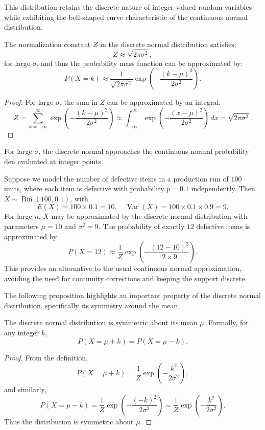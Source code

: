 This distribution retains the discrete nature of integer-valued random variables while exhibiting the bell-shaped curve characteristic of the continuous normal distribution.

\begin{proposition}
The normalization constant \( Z \) in the discrete normal distribution satisfies:
\[
Z \approx \sqrt{2\pi \sigma^2},
\]
for large \( \sigma \), and thus the probability mass function can be approximated by:
\[
P(X = k) \approx \frac{1}{\sqrt{2\pi \sigma^2}} \exp\left( -\frac{(k - \mu)^2}{2\sigma^2} \right).
\]
\end{proposition}
\begin{proof}
For large \( \sigma \), the sum in \( Z \) can be approximated by an integral:
\[
Z = \sum_{k = -\infty}^{\infty} \exp\left( -\frac{(k - \mu)^2}{2\sigma^2} \right) \approx \int_{-\infty}^{\infty} \exp\left( -\frac{(x - \mu)^2}{2\sigma^2} \right) \, dx = \sqrt{2\pi \sigma^2}.
\]
\end{proof}

For large \( \sigma \), the discrete normal approaches the continuous normal probability den evaluated at integer points.

\begin{example}
Suppose we model the number of defective items in a production run of $100$ units, where each item is defective with probability $p = 0.1$ independently. Then $X \sim \operatorname{Bin}(100, 0.1)$, with
\[
E(X) = 100 \times 0.1 = 10, \quad \operatorname{Var}(X) = 100 \times 0.1 \times 0.9 = 9.
\]
For large $n$, $X$ may be approximated by the discrete normal distribution with parameters $\mu = 10$ and $\sigma^2 = 9$. The probability of exactly $12$ defective items is approximated by
\[
P(X = 12) \approx \frac{1}{Z} \exp\!\left( -\frac{(12 - 10)^2}{2 \times 9} \right).
\]
This provides an alternative to the usual continuous normal approximation, avoiding the need for continuity corrections and keeping the support discrete.
\end{example}

The following proposition highlights an important property of the discrete normal distribution, specifically its symmetry around the mean.

\begin{proposition}
The discrete normal distribution is symmetric about its mean $\mu$. Formally, for any integer $k$,
\[
P(X = \mu + k) = P(X = \mu - k).
\]
\end{proposition}
\begin{proof}
From the definition,
\[
P(X = \mu + k) = \frac{1}{Z} \exp\!\left( -\frac{k^2}{2\sigma^2} \right),
\]
and similarly,
\[
P(X = \mu - k) = \frac{1}{Z} \exp\!\left( -\frac{(-k)^2}{2\sigma^2} \right) = \frac{1}{Z} \exp\!\left( -\frac{k^2}{2\sigma^2} \right).
\]
Thus the distribution is symmetric about $\mu$.
\end{proof}

